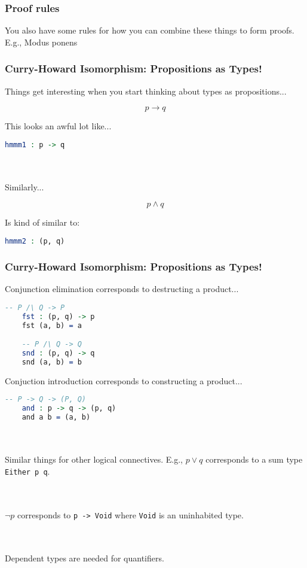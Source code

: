 \documentclass{beamer}
\begin{document}
\begin{frame}
  \frametitle{Proof rules}

  You also have some rules for how you can combine these things to form proofs. E.g., Modus ponens
\end{frame}

\begin{frame}[fragile]
  \frametitle{Curry-Howard Isomorphism: Propositions as Types!}

  Things get interesting when you start thinking about types as propositions...

  \pause

  \[p \rightarrow q\]

  \pause
  This looks an awful lot like...

  \begin{lstlisting}[language=Idris]
    hmmm1 : p -> q
  \end{lstlisting}

  \pause \\~\\
  Similarly...

  \[p \wedge q\]

  \pause
  Is kind of similar to:

  \begin{lstlisting}[language=Idris]
    hmmm2 : (p, q)
  \end{lstlisting}
\end{frame}

\begin{frame}[fragile]
  \frametitle{Curry-Howard Isomorphism: Propositions as Types!}

  Conjunction elimination corresponds to destructing a product...
  \begin{lstlisting}[language=Idris]
    -- P /\ Q -> P
    fst : (p, q) -> p
    fst (a, b) = a

    -- P /\ Q -> Q
    snd : (p, q) -> q
    snd (a, b) = b
  \end{lstlisting}

  \pause
  Conjuction introduction corresponds to constructing a product...
  \begin{lstlisting}[language=Idris]
    -- P -> Q -> (P, Q)
    and : p -> q -> (p, q)
    and a b = (a, b)
  \end{lstlisting}

  \pause \\~\\
  Similar things for other logical connectives. E.g., $p \vee q$ corresponds to a sum type \texttt{Either p q}.

  \pause \\~\\
  $\neg p$ corresponds to \texttt{p -> Void} where \texttt{Void} is an uninhabited type.

  \pause \\~\\
  Dependent types are needed for quantifiers.
\end{frame}
\end{document}
